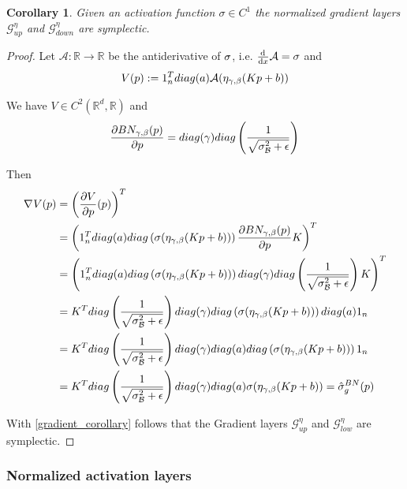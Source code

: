 \documentclass[twoside,a4paper]{article}
\newtheorem{corollary}{Corollary}
\begin{document}
\begin{corollary}
	Given an activation function $\sigma \in C^1$
	the normalized gradient layers $\mathcal{G}^{\eta}_{up}$ and $\mathcal{G}^{\eta}_{down}$
	are symplectic.
\end{corollary}
\begin{proof}
	Let $\mathcal{A}: \mathbb{R} \to \mathbb{R}$ be the antiderivative of $\sigma$, 
	i.e. $\frac{\mathrm{d}^{}}{\mathrm{d}x} \mathcal{A} = \sigma$ and
	\begin{equation*}
		V(p) := 1_{n}^Tdiag(a)\mathcal{A}(\eta_{\gamma, \beta}(Kp+b))
	\end{equation*}

	We have $V \in C^2(\mathbb{R}^d, \mathbb{R})$ and
	\begin{equation*}
		\frac{\partial BN_{\gamma, \beta}(p)}{\partial p} = 
		diag(\gamma)diag\left( \frac{1}{\sqrt{\sigma^2_\mathcal{B} + \epsilon}} \right)
	\end{equation*}

	Then
	\begin{align*}
		\nabla_{}{V(p)} &= \left(\frac{\partial V}{\partial p}(p)\right)^T \\
		&= \left( 1_n^T diag(a) diag \left( \sigma(\eta_{\gamma, \beta}(Kp+b))\right)
		\frac{\partial BN_{\gamma, \beta}(p)}{\partial p} K \right)^T \\
		&= \left( 1_n^T diag(a) diag \left( \sigma(\eta_{\gamma, \beta}(Kp+b))\right)
		diag(\gamma) diag\left( \frac{1}{\sqrt{\sigma^2_\mathcal{B} + \epsilon}} \right) K \right)^T \\
		&= K^T diag\left( \frac{1}{\sqrt{\sigma^2_\mathcal{B} + \epsilon}} \right) diag(\gamma)
		diag\left(\sigma(\eta_{\gamma, \beta}(Kp+b))\right) diag(a) 1_n \\
		&= K^T diag\left( \frac{1}{\sqrt{\sigma^2_\mathcal{B} + \epsilon}} \right) diag(\gamma)
		diag(a) diag\left(\sigma(\eta_{\gamma, \beta}(Kp+b))\right) 1_n \\
		&= K^T diag\left( \frac{1}{\sqrt{\sigma^2_\mathcal{B} + \epsilon}} \right) diag(\gamma)
		diag(a) \sigma(\eta_{\gamma, \beta}(Kp+b)) = \hat{\sigma}^{BN}_g(p)
	\end{align*}

	With \cref{gradient_corollary} follows that the Gradient layers
	$\mathcal{G}^{\eta}_{up}$ and $\mathcal{G}^{\eta}_{low}$ are symplectic.
\end{proof}

\subsubsection{Normalized activation layers}
\end{document}
